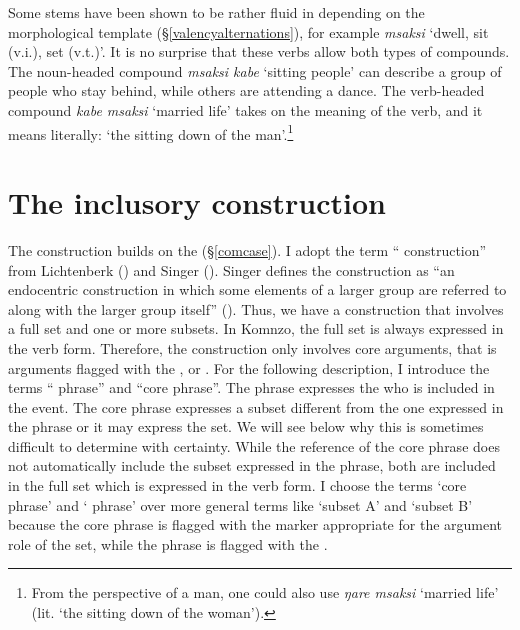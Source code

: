 Some stems have been shown to be rather fluid in  depending on the morphological template ({\S}\ref{valencyalternations}), for example \emph{msaksi} `dwell, sit (v.i.), set (v.t.)'. It is no surprise that these verbs allow both types of compounds. The noun-headed compound \emph{msaksi kabe} `sitting people' can describe a group of people who stay behind, while others are attending a dance. The verb-headed compound \emph{kabe msaksi} `married life' takes on the  meaning of the verb, and it means literally: `the sitting down of the man'.\footnote{From the perspective of a man, one could also use \emph{ŋare msaksi} `married life' (lit. `the sitting down of the woman').}

\section{The inclusory construction}\label{inclusorycontruction}

The  construction builds on the   ({\S}\ref{comcase}). I adopt the term `` construction'' from Lichtenberk (\citeyear{Lichtenberk:2000hr}) and Singer (\citeyear{Singer:inclu}). Singer defines the  construction as ``an endocentric construction in which some elements of a larger group are referred to along with the larger group itself'' (\citeyear[1]{Singer:inclu}). Thus, we have a construction that involves a full set and one or more subsets. In Komnzo, the full set is always expressed in the verb form. Therefore, the  construction only involves core arguments, that is arguments flagged with the ,  or  . For the following description, I introduce the terms `` phrase'' and ``core phrase''. The  phrase expresses the  who is included in the event. The core phrase expresses a subset different from the one expressed in the  phrase or it may express the set. We will see below why this is sometimes difficult to determine with certainty. While the reference of the core phrase does not automatically include the subset expressed in the  phrase, both are included in the full set which is expressed in the verb form. I choose the terms `core phrase' and ` phrase' over more general terms like `subset A' and `subset B' because the core phrase is flagged with the  marker appropriate for the argument role of the set, while the  phrase is flagged with the  .


